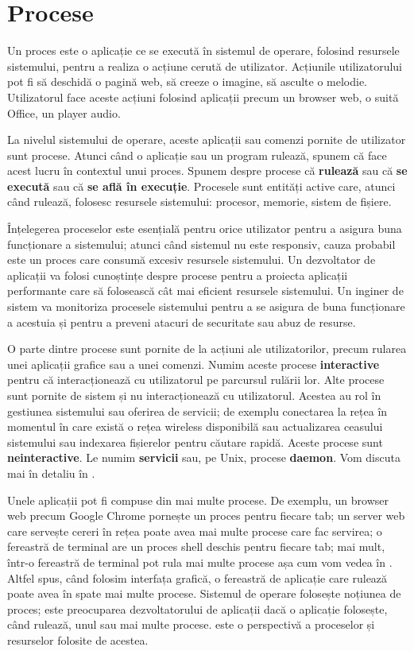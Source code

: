 \chapter{Procese}
\label{chapter:process}

Un proces este o aplicație ce se execută în sistemul de operare, folosind resursele sistemului, pentru a realiza o acțiune cerută de utilizator. Acțiunile utilizatorului pot fi să deschidă o pagină web, să creeze o imagine, să asculte o melodie. Utilizatorul face aceste acțiuni folosind aplicații precum un browser web, o suită Office, un player audio.

La nivelul sistemului de operare, aceste aplicații sau comenzi pornite de
utilizator sunt procese. Atunci când o aplicație sau un program rulează, spunem
că face acest lucru în contextul unui proces. Spunem despre procese că
\textbf{rulează} sau că \textbf{se execută} sau că \textbf{se află în execuție}.
Procesele sunt entități active care, atunci când rulează, folosesc resursele
sistemului: procesor, memorie, sistem de fișiere.

Înțelegerea proceselor este esențială pentru orice utilizator pentru a asigura
buna funcționare a sistemului; atunci când sistemul nu este responsiv, cauza
probabil este un proces care consumă excesiv resursele sistemului. Un
dezvoltator de aplicații va folosi cunoștințe despre procese pentru a proiecta
aplicații performante care să folosească cât mai eficient resursele sistemului.
Un inginer de sistem va monitoriza procesele sistemului pentru a se asigura de
buna funcționare a acestuia și pentru a preveni atacuri de securitate sau abuz
de resurse.

O parte dintre procese sunt pornite de la acțiuni ale utilizatorilor, precum
rularea unei aplicații grafice sau a unei comenzi. Numim aceste procese
\textbf{interactive} pentru că interacționează cu utilizatorul pe parcursul
rulării lor. Alte procese sunt pornite de sistem și nu interacționează cu
utilizatorul. Acestea au rol în gestiunea sistemului sau oferirea de servicii;
de exemplu conectarea la rețea în momentul în care există o rețea wireless
disponibilă sau actualizarea ceasului sistemului sau indexarea fișierelor pentru
căutare rapidă. Aceste procese sunt \textbf{neinteractive}. Le numim
\textbf{servicii} sau, pe Unix, procese \textbf{daemon}. Vom discuta mai în
detaliu în .

Unele aplicații pot fi compuse din mai multe procese. De exemplu, un browser
web precum Google Chrome pornește un proces pentru fiecare tab; un server web
care servește cereri în rețea poate avea mai multe procese care fac servirea; o
fereastră de terminal are un proces shell deschis pentru fiecare tab;
mai mult, într-o fereastră de terminal pot rula mai multe procese așa cum vom
vedea în .
Altfel spus, când folosim interfața grafică, o fereastră de aplicație care
rulează poate avea în spate mai multe procese. Sistemul de operare folosește
noțiunea de proces; este preocuparea dezvoltatorului de aplicații dacă o
aplicație folosește, când rulează, unul sau mai multe procese.  este o perspectivă a proceselor și resurselor folosite de acestea.

